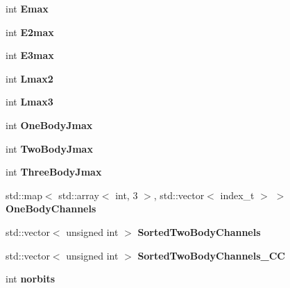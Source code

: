 \begin{DoxyCompactItemize}
\item 
\mbox{\label{classModelSpace_a8b37b79cd05b3454135593cc25a60274}} 
int {\bfseries Emax}
\item 
\mbox{\label{classModelSpace_aa2537fc9072788a01504f556084d50c6}} 
int {\bfseries E2max}
\item 
\mbox{\label{classModelSpace_ad2a482eaa2f453419f4092a7efee9ee7}} 
int {\bfseries E3max}
\item 
\mbox{\label{classModelSpace_acd0bc69b0db1fdd412443b8e0a67d9e3}} 
int {\bfseries Lmax2}
\item 
\mbox{\label{classModelSpace_ab1b256b3a8caaa5e81c566a711f9f8fb}} 
int {\bfseries Lmax3}
\item 
\mbox{\label{classModelSpace_a4c8f0a4476a3b3da3fced59d899f0134}} 
int {\bfseries One\+Body\+Jmax}
\item 
\mbox{\label{classModelSpace_aa2fd94965eb8a508e5ea7d4c879bae0b}} 
int {\bfseries Two\+Body\+Jmax}
\item 
\mbox{\label{classModelSpace_af9ca130d96f582d0ed1a4ef5373bcd05}} 
int {\bfseries Three\+Body\+Jmax}
\item 
\mbox{\label{classModelSpace_a0b27e85c3538e95927b8c0001fc4f8dd}} 
std\+::map$<$ std\+::array$<$ int, 3 $>$, std\+::vector$<$ index\+\_\+t $>$ $>$ {\bfseries One\+Body\+Channels}
\item 
\mbox{\label{classModelSpace_a8a49aa276b035647cc25a19c4362d8ba}} 
std\+::vector$<$ unsigned int $>$ {\bfseries Sorted\+Two\+Body\+Channels}
\item 
\mbox{\label{classModelSpace_af009fd2acaada10b6a4380153a6c79cb}} 
std\+::vector$<$ unsigned int $>$ {\bfseries Sorted\+Two\+Body\+Channels\+\_\+\+CC}
\item 
\mbox{\label{classModelSpace_af5970e6865dd69177eb0f74fa269ff17}} 
int {\bfseries norbits}

\end{DoxyCompactItemize}
